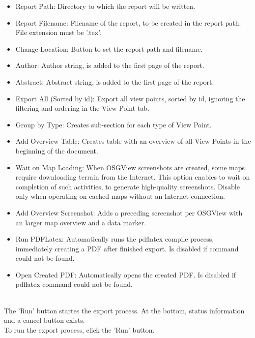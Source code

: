\begin{itemize}  
\item Report Path: Directory to which the report will be written.
\item Report Filename: Filename of the report, to be created in the report path. File extension must be '.tex'.
\item Change Location: Button to set the report path and filename.
\item Author: Author string, is added to the first page of the report.
\item Abstract: Abstract string, is added to the first page of the report.
\item Export All (Sorted by id): Export all view points, sorted by id, ignoring the filtering and ordering in the View Point tab.
\item Group by Type: Creates sub-section for each type of View Point.
\item Add Overview Table: Creates table with an overview of all View Points in the beginning of the document. 
\item Wait on Map Loading: When OSGView screenshots are created, some maps require downloading terrain from the Internet.  This option enables to wait on completion of such activities, to generate high-quality screenshots. Disable only when operating on cached maps without an Internet connection.
\item Add Overview Screenshot: Adds a preceding screenshot per OSGView with an larger map overview and a data marker.
\item Run PDFLatex: Automatically runs the pdflatex compile process, immediately creating a PDF after finished export. Is disabled if command could not be found.
\item Open Created PDF: Automatically opens the created PDF. Is disabled if pdflatex command could not be found.
\end{itemize}
\ \\

The 'Run' button startes the export process. At the bottom, status information and a cancel button exists. \\

To run the export process, click the 'Run' button.

